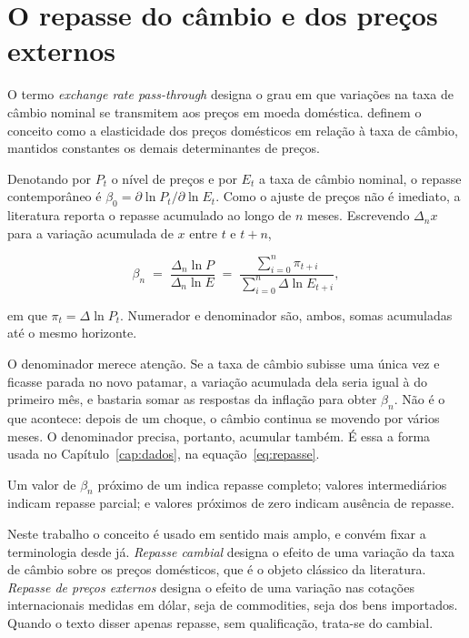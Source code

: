 \documentclass[12pt,openright,oneside,a4paper,portuguese,brazil]{abntex2}
\begin{document}
\section{O repasse do câmbio e dos preços externos}
\label{sec:erpt-def}

O termo \textit{exchange rate pass-through} designa o grau em que variações na
taxa de câmbio nominal se transmitem aos preços em moeda doméstica.
 definem o conceito como a elasticidade dos preços
domésticos em relação à taxa de câmbio, mantidos constantes os demais
determinantes de preços.

Denotando por $P_t$ o nível de preços e por $E_t$ a taxa de câmbio nominal, o
repasse contemporâneo é $\beta_0 = \partial \ln P_t / \partial \ln E_t$. Como o
ajuste de preços não é imediato, a literatura reporta o repasse acumulado ao
longo de $n$ meses. Escrevendo $\Delta_n x$ para a variação acumulada de $x$
entre $t$ e $t+n$,

\begin{equation}
\beta_{n} \;=\; \frac{\Delta_n \ln P}{\Delta_n \ln E}
\;=\; \frac{\sum_{i=0}^{n} \pi_{t+i}}{\sum_{i=0}^{n} \Delta \ln E_{t+i}} ,
\label{eq:erpt}
\end{equation}

\noindent em que $\pi_{t} = \Delta \ln P_{t}$. Numerador e denominador são,
ambos, somas acumuladas até o mesmo horizonte.

O denominador merece atenção. Se a taxa de câmbio subisse uma única vez e
ficasse parada no novo patamar, a variação acumulada dela seria igual à do
primeiro mês, e bastaria somar as respostas da inflação para obter $\beta_n$. Não é o que acontece: depois de um
choque, o câmbio continua se movendo por vários meses. O denominador precisa,
portanto, acumular também. É essa a forma usada no Capítulo~\ref{cap:dados},
na equação~\eqref{eq:repasse}.

Um valor de $\beta_n$ próximo de um indica repasse completo; valores
intermediários indicam repasse parcial; e valores próximos de zero indicam
ausência de repasse.

Neste trabalho o conceito é usado em sentido mais amplo, e convém fixar a
terminologia desde já. \textit{Repasse cambial} designa o efeito de uma
variação da taxa de câmbio sobre os preços domésticos, que é o objeto clássico
da literatura. \textit{Repasse de preços externos} designa o efeito de uma
variação nas cotações internacionais medidas em dólar, seja de commodities,
seja dos bens importados. Quando o texto disser apenas repasse, sem
qualificação, trata-se do cambial.
\end{document}
